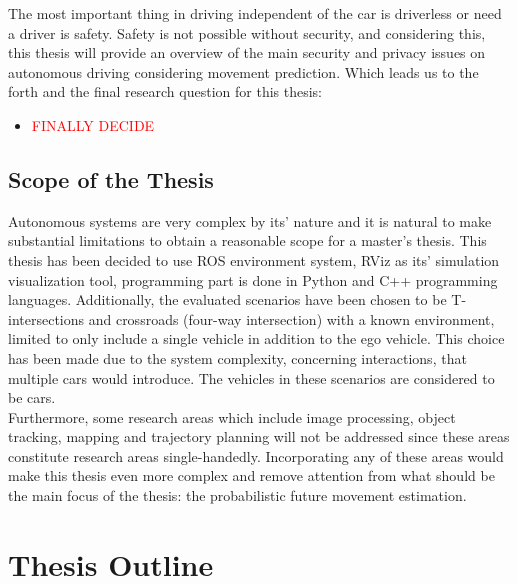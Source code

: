 The most important thing in driving independent of the car is driverless or need a driver is safety. Safety is not possible without security, and considering this, this thesis will provide an overview of the main security and privacy issues on autonomous driving considering movement prediction. Which leads us to the forth and the final research question for this thesis:
\begin{itemize}
	\item \textcolor{red}{FINALLY DECIDE} 
\end{itemize}

\subsection{Scope of the Thesis}

Autonomous systems are very complex by its' nature and it is natural to make substantial limitations to obtain a reasonable scope for a master’s thesis. This thesis has been decided to use \gls{ROS} environment system, RViz as its' simulation visualization tool, programming part is done in Python and C++ programming languages. Additionally, the evaluated scenarios have been chosen to be T-intersections and crossroads (four-way intersection) with a known environment, limited to only include a single vehicle in addition to the ego vehicle. This choice has been made due to the system complexity, concerning interactions, that multiple cars would introduce. The vehicles in these scenarios are considered to be cars. \\
Furthermore, some research areas which include image processing, object tracking, mapping and trajectory planning will not be addressed since these areas constitute research areas single-handedly. Incorporating any of these areas would make this thesis even more complex and remove attention from what should be the main focus of the thesis: the probabilistic future movement estimation.

\section{Thesis Outline}


